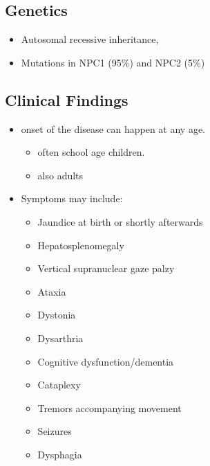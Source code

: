 \documentclass{scrartcl}
\begin{document}
\subsection{Genetics}
\label{sec:org64357fe}
\begin{itemize}
\item Autosomal recessive inheritance,
\item Mutations in NPC1 (95\%) and NPC2 (5\%)
\end{itemize}

\subsection{Clinical Findings}
\label{sec:org12a3335}
\begin{itemize}
\item onset of the disease can happen at any age.
\begin{itemize}
\item often school age children.
\item also adults
\end{itemize}

\item Symptoms may include:
\begin{itemize}
\item Jaundice at birth or shortly afterwards
\item Hepatosplenomegaly
\item Vertical supranuclear gaze palzy
\item Ataxia
\item Dystonia
\item Dysarthria
\item Cognitive dysfunction/dementia
\item Cataplexy
\item Tremors accompanying movement
\item Seizures
\item Dysphagia
\end{itemize}
\end{itemize}
\end{document}
